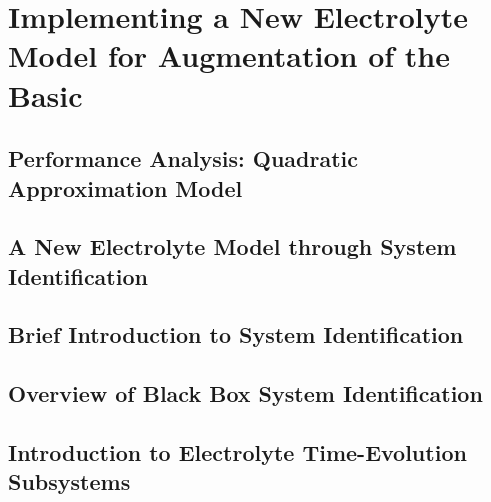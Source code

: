
\graphicspath{{chapters/sys_id/figures/}}

\clearpage
\chapter{Implementing a New Electrolyte Model for Augmentation of the Basic }\label{ch:newelectrolytemodel}
\startcontents[chapters]

\bigskip



\section{Performance Analysis: Quadratic Approximation Model}\label{sec:symbolicregression}


\section{A New Electrolyte Model through System Identification}\label{sec:newelectrolytemodel}


\section{Brief Introduction to System Identification}\label{subsec:introsysid}


\section{Overview of Black Box System Identification}\label{sec:introblackboxsysid}


\section{Introduction to Electrolyte Time-Evolution Subsystems}\label{sec:introtoplant}


